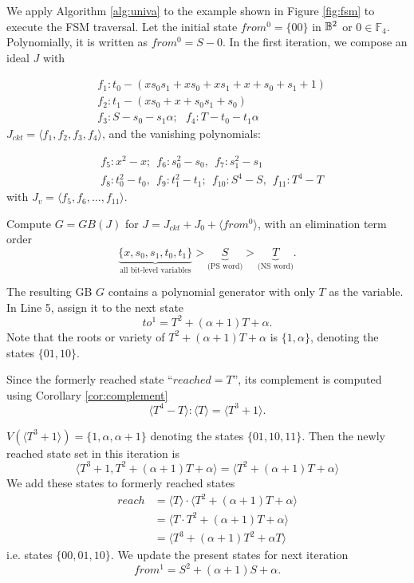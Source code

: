 \begin{Example}
\label{ex:SMPO}
We apply Algorithm \ref{alg:univa} to the example shown in
Figure \ref{fig:fsm} to execute the FSM traversal. Let the initial state
$from^0 = \{00\}$ in ${\mathbb{B}}^2$ or $0 \in \mathbb F_4$. Polynomially, it is
written as $from^0 = S - 0$. In the first iteration, we compose
an ideal $J$ with 

\begin{align*}
&f_1: t_0- (xs_0s_1+xs_0+xs_1+x+s_0+s_1+1)\\
&f_2: t_1 - (xs_0+x+s_0s_1+s_0)\\
&f_3: S - s_0 - s_1\alpha; ~~~f_4: T - t_0 - t_1\alpha
\end{align*}
$J_{ckt} = \langle f_1,f_2,f_3,f_4\rangle$, and the vanishing
polynomials: 

\begin{align*}
&f_5: x^2-x; ~~f_6: s_0^2-s_0, ~~f_7: s_1^2-s_1\\
&f_8: t_0^2-t_0, ~~f_9: t_1^2-t_1; ~~f_{10}: S^4-S, ~~f_{11}:T^4-T
\end{align*}
with $J_v = \langle f_5,f_6,\dots,f_{11}\rangle$.


Compute $G = GB(J)$ for $J = J_{ckt}+J_0+\langle from^0\rangle$,
with an elimination term order 
$$ \underbrace{\{x,s_0,s_1,t_0,t_1\}}_{\text{all bit-level variables}} 
> \underbrace{S}_{\text{(PS~word)}} > \underbrace{T}_{\text{(NS~word)}}.$$

The resulting GB $G$ contains a polynomial generator with only $T$ as
the variable. In Line 5, assign it to the next state $$to^1 =
T^2+(\alpha+1)T+\alpha.$$ Note that the roots or variety of
$T^2+(\alpha+1)T+\alpha$ is $\{1, \alpha\}$, denoting the states
$\{01,10\}$. 

Since the formerly reached state ``$reached = T$'', its complement is
computed using Corollary \ref{cor:complement} 
$$\langle T^4-T\rangle:\langle T\rangle
= \langle T^3+1\rangle.$$ 

$V(\langle T^3 + 1\rangle) = \{1, \alpha, \alpha+1\}$ denoting the states
$\{01,10,11\}$. Then the newly reached state set in this iteration is 
$$\langle T^3+1, T^2+(\alpha+1)T+\alpha \rangle = \langle
T^2+(\alpha+1)T+\alpha \rangle$$ We add these states 
to formerly reached states 
\begin{align*}
reach &= \langle T\rangle \cdot \langle T^2+(\alpha+1)T+\alpha \rangle \\
&= \langle T\cdot T^2+(\alpha+1)T+\alpha \rangle \\
&= \langle T^3+(\alpha+1)T^2+\alpha T\rangle
\end{align*}
 i.e. states $\{00,01,10\}$. We update the present states
for next iteration $$from^1 = S^2+(\alpha+1)S+\alpha.$$ 


\end{Example}
